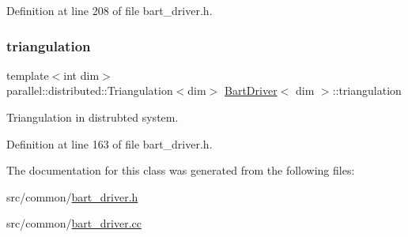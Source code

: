 Definition at line 208 of file bart\+\_\+driver.\+h.

\mbox{\label{class_bart_driver_a8bdcafa21b042017d1e871ed07ae3a81}} 
\subsubsection{\texorpdfstring{triangulation}{triangulation}}
{\footnotesize\ttfamily template$<$int dim$>$ \\
parallel\+::distributed\+::\+Triangulation$<$dim$>$ \hyperlink{class_bart_driver}{Bart\+Driver}$<$ dim $>$\+::triangulation\hspace{0.3cm}{\ttfamily [private]}}



Triangulation in distrubted system. 



Definition at line 163 of file bart\+\_\+driver.\+h.



The documentation for this class was generated from the following files\+:\begin{DoxyCompactItemize}
\item 
src/common/\hyperlink{bart__driver_8h}{bart\+\_\+driver.\+h}\item 
src/common/\hyperlink{bart__driver_8cc}{bart\+\_\+driver.\+cc}\end{DoxyCompactItemize}
